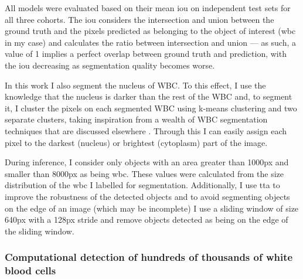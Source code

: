All models were evaluated based on their mean \ac{iou} on independent test sets for all three cohorts. The \ac{iou} considers the intersection and union between the ground truth and the pixels predicted as belonging to the object of interest (\ac{wbc} in my case) and calculates the ratio between intersection and union --- as such, a value of 1 implies a perfect overlap between ground truth and prediction, with the \ac{iou} decreasing as segmentation quality becomes worse.

In this work I also segment the nucleus of WBC. To this effect, I use the knowledge that the nucleus is darker than the rest of the WBC and, to segment it, I cluster the pixels on each segmented WBC using k-means clustering and two separate clusters, taking inspiration from a wealth of WBC segmentation techniques that are discussed elsewhere \cite{Andrade2019-qv}. Through this I can easily assign each pixel to the darkest (nucleus) or brightest (cytoplasm) part of the image.

During inference, I consider only objects with an area greater than 1000px and smaller than 8000px as being \ac{wbc}. These values were calculated from the size distribution of the \ac{wbc} I labelled for segmentation. Additionally, I use \ac{tta} to improve the robustness of the detected objects and to avoid segmenting objects on the edge of an image (which may be incomplete) I use a sliding window of size 640px with a 128px stride and remove objects detected as being on the edge of the sliding window. 

\subsubsection{Computational detection of hundreds of thousands of white blood cells}

